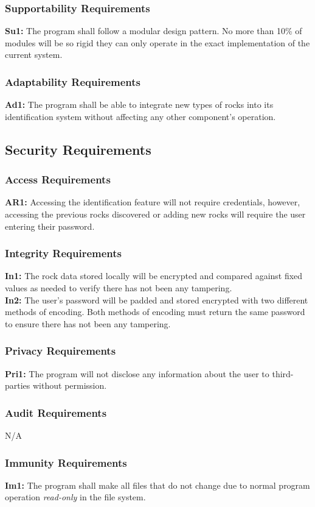 \documentclass[titlepage]{article}
\begin{document}
\subsubsection{Supportability Requirements}
\textbf{Su1:} The program shall follow a modular design pattern. No more than 10\% of modules will be so rigid they can only operate in the exact implementation of the current system.
\subsubsection{Adaptability Requirements}
\textbf{Ad1:} The program shall be able to integrate new types of rocks into its identification system without affecting any other component's operation.

\subsection{Security Requirements}
\subsubsection{Access Requirements}
\textbf{AR1:} Accessing the identification feature will not require credentials, however, accessing the previous rocks discovered or adding new rocks will require the user entering their password.
\subsubsection{Integrity Requirements}
\textbf{In1:} The rock data stored locally will be encrypted and compared against fixed values as needed to verify there has not been any tampering.\\

\noindent\textbf{In2:} The user's password will be padded and stored encrypted with two different methods of encoding. Both methods of encoding must return the same password to ensure there has not been any tampering.
\subsubsection{Privacy Requirements}
\textbf{Pri1:} The program will not disclose any information about the user to third-parties without permission.
\subsubsection{Audit Requirements}
N/A
\subsubsection{Immunity Requirements}
\textbf{Im1:} The program shall make all files that do not change due to normal program operation \textit{read-only} in the file system.\\
\end{document}

